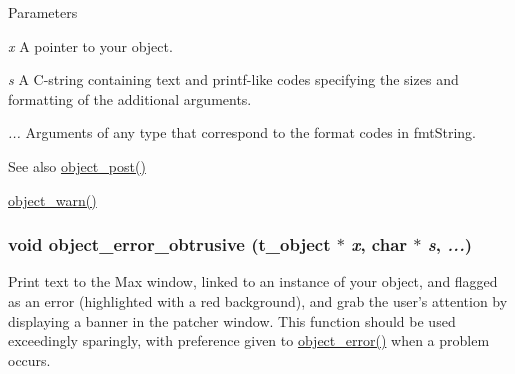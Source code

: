 \begin{DoxyParams}{Parameters}
\item[{\em x}]A pointer to your object. \item[{\em s}]A C-\/string containing text and printf-\/like codes specifying the sizes and formatting of the additional arguments. \item[{\em ...}]Arguments of any type that correspond to the format codes in fmtString.\end{DoxyParams}
\begin{DoxySeeAlso}{See also}
\hyperlink{group__console_gafb92b17363269d4d26de1823cbc2492d}{object\_\-post()} 

\hyperlink{group__console_ga7ab11c5e9e345384ad282fcd5b86275c}{object\_\-warn()} 
\end{DoxySeeAlso}
\hypertarget{group__console_ga42a612b12b1a24380a45ab1b9278b950}{
\subsubsection[{object\_\-error\_\-obtrusive}]{\setlength{\rightskip}{0pt plus 5cm}void object\_\-error\_\-obtrusive ({\bf t\_\-object} $\ast$ {\em x}, \/  char $\ast$ {\em s}, \/   {\em ...})}}
\label{group__console_ga42a612b12b1a24380a45ab1b9278b950}


Print text to the Max window, linked to an instance of your object, and flagged as an error (highlighted with a red background), and grab the user's attention by displaying a banner in the patcher window. This function should be used exceedingly sparingly, with preference given to \hyperlink{group__console_ga05f7fed66fafc6e4d2e372b7f0fe4e43}{object\_\-error()} when a problem occurs.


